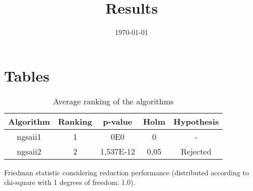 \documentclass{article}
\title{Results}
\author{}
\date{\today}
\begin{document}
\oddsidemargin 0in \topmargin 0in\maketitle

\section{Tables}
\begin{table}[!htp]
\centering
\begin{tabular}{c|c|c|c|c}
Algorithm&Ranking&p-value&Holm&Hypothesis\\
\hline
ngsaii1 & 1 & 0E0 & 0 & -\\
ngsaii2 & 2 & 1,537E-12 & 0,05 & Rejected\\
\end{tabular}
\caption{Average ranking of the algorithms}
\end{table}


Friedman statistic considering reduction performance (distributed according to chi-square with 1 degrees of freedom: 1.0).
\end{document}
